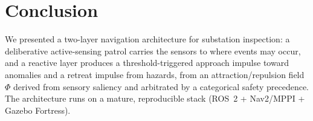 \section{Conclusion}
\label{sec:conclusion}
We presented a two-layer navigation architecture for substation inspection: a
deliberative active-sensing patrol carries the sensors to where events may occur,
and a reactive layer produces a threshold-triggered approach impulse toward
anomalies and a retreat impulse from hazards, from an attraction/repulsion field
$\Phi$ derived from sensory saliency and arbitrated by a categorical safety
precedence. The architecture runs on a mature, reproducible stack (ROS~2 +
Nav2/MPPI + Gazebo Fortress).

